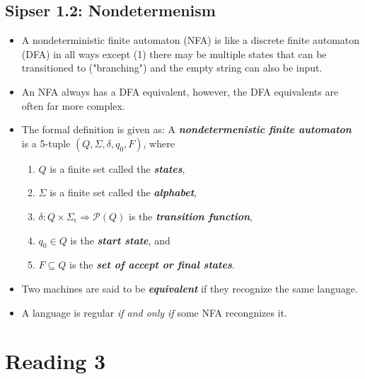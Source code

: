 \documentclass{article}
\begin{document}
\subsection{Sipser 1.2: Nondetermenism}
\begin{itemize}
    \item A nondeterministic finite automaton (NFA) is like a discrete finite automaton (DFA) in all ways except (1) there may be multiple states that can be transitioned to ("branching") and the empty string can also be input.
    \item An NFA always has a DFA equivalent, however, the DFA equivalents are often far more complex.
    \item The formal definition is given as: A \textbf{\textit{nondetermenistic finite automaton}} is a 5-tuple $(Q,\Sigma,\delta,q_0,F)$, where 
    \begin{enumerate}
        \item $Q$ is a finite set called the \textbf{\textit{states}},
        \item $\Sigma$ is a finite set called the \textbf{\textit{alphabet}},
        \item $\delta: Q \times \Sigma_\epsilon \Rightarrow \mathcal{P}(Q)$ is the \textbf{\textit{transition function}},
        \item $q_0 \in Q$ is the \textbf{\textit{start state}}, and
        \item $F \subseteq Q$ is the \textbf{\textit{set of accept or final states}}.
    \end{enumerate}
    \item Two machines are said to be \textbf{\textit{equivalent}} if they recognize the same language.
    \item A language is regular \textit{if and only if} some NFA recongnizes it.
\end{itemize}

\section{Reading 3}
\end{document}
